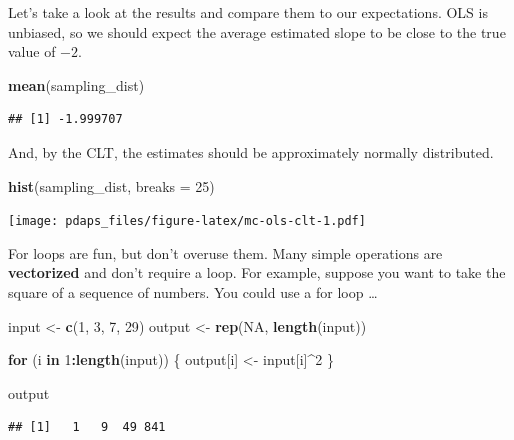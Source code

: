 \documentclass[12pt,oneside,openany]{book}
\newenvironment{Shaded}{\begin{snugshade}}{\end{snugshade}}
\newcommand{\KeywordTok}[1]{\textcolor[rgb]{0.13,0.29,0.53}{\textbf{#1}}}
\newcommand{\DataTypeTok}[1]{\textcolor[rgb]{0.13,0.29,0.53}{#1}}
\newcommand{\DecValTok}[1]{\textcolor[rgb]{0.00,0.00,0.81}{#1}}
\newcommand{\StringTok}[1]{\textcolor[rgb]{0.31,0.60,0.02}{#1}}
\newcommand{\OtherTok}[1]{\textcolor[rgb]{0.56,0.35,0.01}{#1}}
\newcommand{\ControlFlowTok}[1]{\textcolor[rgb]{0.13,0.29,0.53}{\textbf{#1}}}
\newcommand{\OperatorTok}[1]{\textcolor[rgb]{0.81,0.36,0.00}{\textbf{#1}}}
\newcommand{\NormalTok}[1]{#1}
\begin{document}
Let's take a look at the results and compare them to our expectations.
OLS is unbiased, so we should expect the average estimated slope to be
close to the true value of \(-2\).

\begin{Shaded}
\begin{Highlighting}[]
\KeywordTok{mean}\NormalTok{(sampling_dist)}
\end{Highlighting}
\end{Shaded}

\begin{verbatim}
## [1] -1.999707
\end{verbatim}

And, by the CLT, the estimates should be approximately normally
distributed.

\begin{Shaded}
\begin{Highlighting}[]
\KeywordTok{hist}\NormalTok{(sampling_dist, }\DataTypeTok{breaks =} \DecValTok{25}\NormalTok{)}
\end{Highlighting}
\end{Shaded}

\texttt{[image: pdaps\_files/figure-latex/mc-ols-clt-1.pdf]}

For loops are fun, but don't overuse them. Many simple operations are
\textbf{vectorized} and don't require a loop. For example, suppose you
want to take the square of a sequence of numbers. You could use a for
loop \ldots{}

\begin{Shaded}
\begin{Highlighting}[]
\NormalTok{input <-}\StringTok{ }\KeywordTok{c}\NormalTok{(}\DecValTok{1}\NormalTok{, }\DecValTok{3}\NormalTok{, }\DecValTok{7}\NormalTok{, }\DecValTok{29}\NormalTok{)}
\NormalTok{output <-}\StringTok{ }\KeywordTok{rep}\NormalTok{(}\OtherTok{NA}\NormalTok{, }\KeywordTok{length}\NormalTok{(input))}

\ControlFlowTok{for}\NormalTok{ (i }\ControlFlowTok{in} \DecValTok{1}\OperatorTok{:}\KeywordTok{length}\NormalTok{(input)) \{}
\NormalTok{  output[i] <-}\StringTok{ }\NormalTok{input[i]}\OperatorTok{^}\DecValTok{2}
\NormalTok{\}}

\NormalTok{output}
\end{Highlighting}
\end{Shaded}

\begin{verbatim}
## [1]   1   9  49 841
\end{verbatim}
\end{document}
